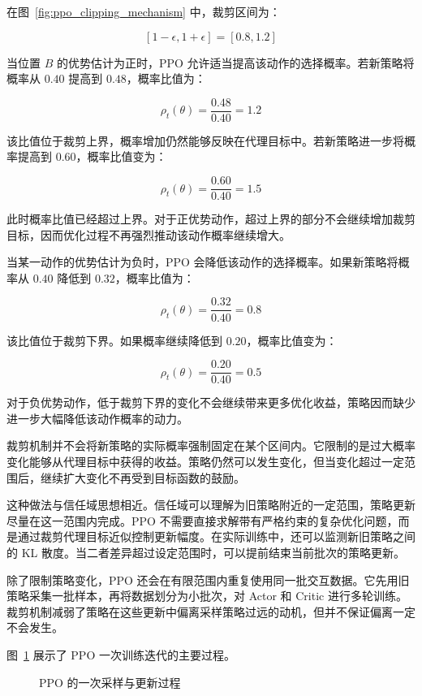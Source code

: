 在图~\ref{fig:ppo_clipping_mechanism} 中，裁剪区间为：

\[
[1-\epsilon,1+\epsilon]=[0.8,1.2]
\]

当位置 $B$ 的优势估计为正时，PPO 允许适当提高该动作的选择概率。若新策略将概率从 $0.40$ 提高到 $0.48$，概率比值为：

\[
\rho_t(\theta)=\frac{0.48}{0.40}=1.2
\]

该比值位于裁剪上界，概率增加仍然能够反映在代理目标中。若新策略进一步将概率提高到 $0.60$，概率比值变为：

\[
\rho_t(\theta)=\frac{0.60}{0.40}=1.5
\]

此时概率比值已经超过上界。对于正优势动作，超过上界的部分不会继续增加裁剪目标，因而优化过程不再强烈推动该动作概率继续增大。

当某一动作的优势估计为负时，PPO 会降低该动作的选择概率。如果新策略将概率从 $0.40$ 降低到 $0.32$，概率比值为：

\[
\rho_t(\theta)=\frac{0.32}{0.40}=0.8
\]

该比值位于裁剪下界。如果概率继续降低到 $0.20$，概率比值变为：

\[
\rho_t(\theta)=\frac{0.20}{0.40}=0.5
\]

对于负优势动作，低于裁剪下界的变化不会继续带来更多优化收益，策略因而缺少进一步大幅降低该动作概率的动力。

裁剪机制并不会将新策略的实际概率强制固定在某个区间内。它限制的是过大概率变化能够从代理目标中获得的收益。策略仍然可以发生变化，但当变化超过一定范围后，继续扩大变化不再受到目标函数的鼓励。

这种做法与信任域思想相近。信任域可以理解为旧策略附近的一定范围，策略更新尽量在这一范围内完成。PPO 不需要直接求解带有严格约束的复杂优化问题，而是通过裁剪代理目标近似控制更新幅度。在实际训练中，还可以监测新旧策略之间的 KL 散度。当二者差异超过设定范围时，可以提前结束当前批次的策略更新。

除了限制策略变化，PPO 还会在有限范围内重复使用同一批交互数据。它先用旧策略采集一批样本，再将数据划分为小批次，对 Actor 和 Critic 进行多轮训练。裁剪机制减弱了策略在这些更新中偏离采样策略过远的动机，但并不保证偏离一定不会发生。

图~\ref{fig:ppo_training_process} 展示了 PPO 一次训练迭代的主要过程。

\begin{figure}[htbp]
  \centering
  \resizebox{0.94\linewidth}{!}{
    
  }
  \caption{PPO 的一次采样与更新过程}
  \label{fig:ppo_training_process}
\end{figure}

